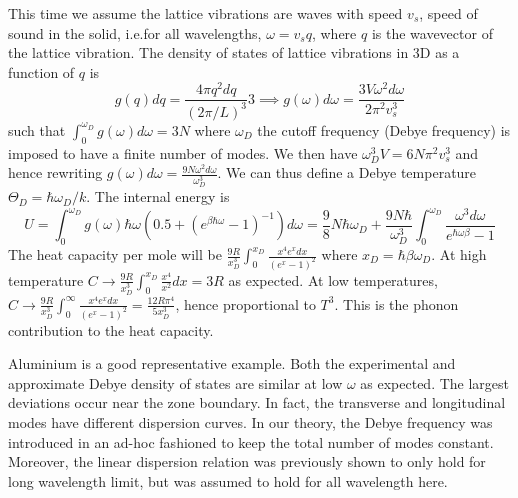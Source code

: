 \documentclass[a4paper]{article}
\begin{document}
\begin{Note}
This time we assume the lattice vibrations are waves with speed $v_s$, speed of sound in the solid, i.e.for all wavelengths, $\omega=v_sq$, where $q$ is the wavevector of the lattice vibration. The density of states of lattice vibrations in 3D as a function of $q$ is
$$g(q)dq=\frac{4\pi q^2dq}{(2\pi/L)^3}3\implies g(\omega)d\omega=\frac{3V\omega^2d\omega}{2\pi^2v_s^3}$$
such that $\int_0^{\omega_D}g(\omega)d\omega=3N$ where $\omega_D$ the cutoff frequency (Debye frequency) is imposed to have a finite number of modes. We then have $\omega_D^3V=6N\pi^2v_s^3$ and hence rewriting $g(\omega)d\omega=\frac{9N\omega^2d\omega}{\omega_D^3}$. We can thus define a Debye temperature $\Theta_D=\hbar\omega_D/k$. The internal energy is 
$$U=\int_0^{\omega_D}g(\omega)\hbar\omega(0.5+(e^{\beta\hbar\omega}-1)^{-1})d\omega=\frac{9}{8}N\hbar\omega_D+\frac{9N\hbar}{\omega_D^3}\int_0^{\omega_D}\frac{\omega^3d\omega}{e^{\hbar\omega\beta}-1}$$
The heat capacity per mole will be $\frac{9R}{x_D^3}\int_0^{x_D}\frac{x^4e^xdx}{(e^x-1)^2}$ where $x_D=\hbar\beta\omega_D$. At high temperature $C\rightarrow\frac{9R}{x_D^3}\int_0^{x_D}\frac{x^4}{x^2}dx=3R$ as expected. At low temperatures, $C\rightarrow\frac{9R}{x_D^3}\int_0^\infty\frac{x^4e^xdx}{(e^x-1)^2}=\frac{12R\pi^4}{5x_D^3}$, hence proportional to $T^3$. This is the phonon contribution to the heat capacity.
\end{Note}
\begin{Note}
Aluminium is a good representative example. Both the experimental and approximate Debye density of states are similar at low $\omega$ as expected. The largest deviations occur near the zone boundary. In fact, the transverse and longitudinal modes have different dispersion curves. In our theory, the Debye frequency was introduced in an ad-hoc fashioned to keep the total number of modes constant. Moreover, the linear dispersion relation was previously shown to only hold for long wavelength limit, but was assumed to hold for all wavelength here.
\end{Note}
\newpage
\end{document}
